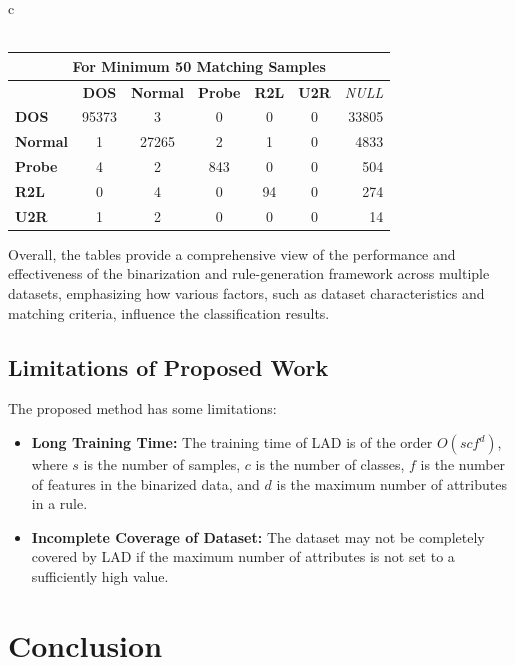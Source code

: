 \documentclass[pdflatex,sn-mathphys-num]{sn-jnl}%
\theoremstyle{thmstyleone}%
\theoremstyle{thmstyletwo}%
\theoremstyle{thmstylethree}%
\begin{document}
\begin{table}[ht!]
\begin{tabular}{c}
\\
\\
    \begin{tabular}{|l|c|c|c|c|c|r|}
        \hline
        \multicolumn{7}{|c|}{\textbf{For Minimum 50 Matching Samples}} \\ \hline
         & \textbf{DOS} & \textbf{Normal} & \textbf{Probe} & \textbf{R2L} & \textbf{U2R} & \textit{NULL} \\ \hline 
        \textbf{DOS} & 95373 & 3 & 0 & 0 & 0 & 33805 \\ \hline 
        \textbf{Normal} & 1 & 27265 & 2 & 1 & 0 & 4833 \\ \hline
        \textbf{Probe} & 4 & 2 & 843 & 0 & 0 & 504 \\ \hline
        \textbf{R2L} & 0 & 4 & 0 & 94 & 0 & 274 \\ \hline
        \textbf{U2R} & 1 & 2 & 0 & 0 & 0 & 14 \\ \hline
    \end{tabular}

    \end{tabular}
\end{table}

Overall, the tables provide a comprehensive view of the performance and effectiveness of the binarization and rule-generation framework across multiple datasets, emphasizing how various factors, such as dataset characteristics and matching criteria, influence the classification results.


\subsection{Limitations of Proposed Work}
The proposed method has some limitations:

\begin{itemize}
    \item \textbf{Long Training Time:} The training time of LAD is of the order \( O(scf^d) \), where \(s\) is the number of samples, \(c\) is the number of classes, \(f\) is the number of features in the binarized data, and \(d\) is the maximum number of attributes in a rule.
    \item \textbf{Incomplete Coverage of Dataset:} The dataset may not be completely covered by LAD if the maximum number of attributes is not set to a sufficiently high value.
\end{itemize}

\section{Conclusion} \label{sec:Conclusion}
\end{document}
